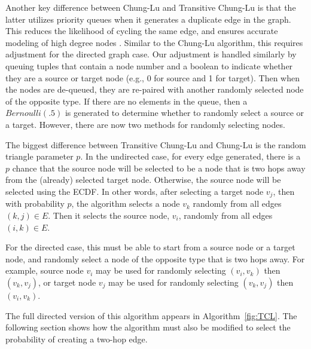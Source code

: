 \documentclass[pdftex,11pt,a4paper,twocolumn]{scrartcl}
\begin{document}
Another key difference between Chung-Lu and Transitive Chung-Lu is that the latter utilizes priority queues when it generates a duplicate edge in the graph. This reduces the likelihood of cycling the same edge, and ensures accurate modeling of high degree nodes \cite{fgls}. Similar to the Chung-Lu algorithm, this requires adjustment for the directed graph case. Our adjustment is handled similarly by queuing tuples that contain a node number and a boolean to indicate whether they are a source or target node (e.g., 0 for source and 1 for target). Then when the nodes are de-queued, they are re-paired with another randomly selected node of the opposite type. If there are no elements in the queue, then a $Bernoulli(.5)$ is generated to determine whether to randomly select a source or a target. However, there are now two methods for randomly selecting nodes. 

The biggest difference between Transitive Chung-Lu and Chung-Lu is the random triangle parameter $p$. In the undirected case, for every edge generated, there is a $p$ chance that the source node will be selected to be a node that is two hops away from the (already) selected target node. Otherwise, the source node will be selected using the ECDF. In other words, after selecting a target node $v_j$, then with probability $p$, the algorithm selects a node $v_k$ randomly from all edges $(k,j) \in E$. Then it selects the source node, $v_i$, randomly from all edges $(i,k) \in E$. 

For the directed case, this must be able to start from a source node or a target node, and randomly select a node of the opposite type that is two hops away. For example, source node $v_i$ may be used for randomly selecting $(v_i, v_k)$ then $(v_k, v_j)$, or target node $v_j$ may be used for randomly selecting $(v_k,v_j)$ then $(v_i,v_k)$. 

The full directed version of this algorithm appears in Algorithm~\ref{fig:TCL}. The following section shows how the algorithm must also be modified to select the probability of creating a two-hop edge.  
\end{document}
